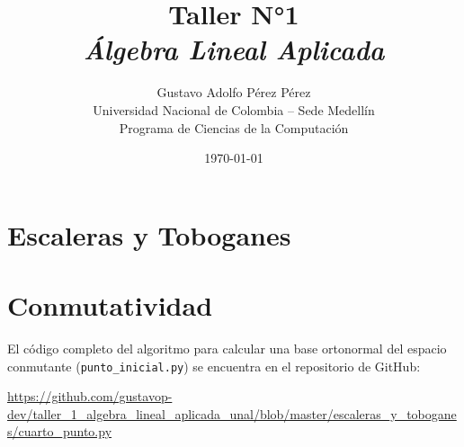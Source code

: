 \documentclass{article}
\title{Taller N°1 \\ \textit{Álgebra Lineal Aplicada}}
\author{Gustavo Adolfo P\'erez P\'erez\\Universidad Nacional de Colombia -- Sede Medell\'in\\Programa de Ciencias de la Computaci\'on}
\date{\today}
\begin{document}
\maketitle

\section{Escaleras y Toboganes}





\section{Conmutatividad}
El código completo del algoritmo para calcular una base ortonormal del espacio conmutante (\texttt{punto\_inicial.py}) se encuentra en el repositorio de GitHub:

\begin{center}
\url{https://github.com/gustavop-dev/taller_1_algebra_lineal_aplicada_unal/blob/master/escaleras_y_toboganes/cuarto_punto.py}
\end{center}





\end{document}
